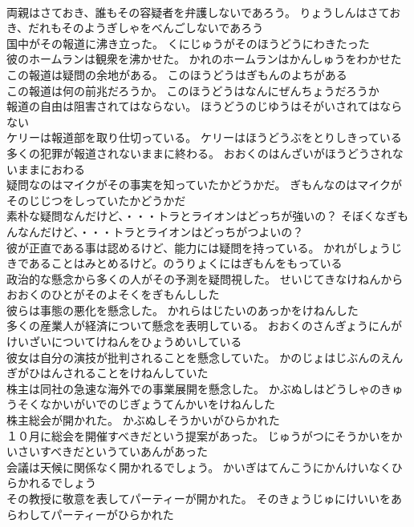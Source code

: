 \documentclass[8pt]{extreport}
\begin{document}
\begin{CJK}{UTF8}{min}
\\	両親はさておき、誰もその容疑者を弁護しないであろう。	りょうしんはさておき、だれもそのようぎしゃをべんごしないであろう 
\\	国中がその報道に沸き立った。	くにじゅうがそのほうどうにわきたった 
\\	彼のホームランは観衆を沸かせた。	かれのホームランはかんしゅうをわかせた 
\\	この報道は疑問の余地がある。	このほうどうはぎもんのよちがある 
\\	この報道は何の前兆だろうか。	このほうどうはなんにぜんちょうだろうか 
\\	報道の自由は阻害されてはならない。	ほうどうのじゆうはそがいされてはならない 
\\	ケリーは報道部を取り仕切っている。	ケリーはほうどうぶをとりしきっている 
\\	多くの犯罪が報道されないままに終わる。	おおくのはんざいがほうどうされないままにおわる 
\\	疑問なのはマイクがその事実を知っていたかどうかだ。	ぎもんなのはマイクがそのじじつをしっていたかどうかだ 
\\	素朴な疑問なんだけど、・・・トラとライオンはどっちが強いの？	そぼくなぎもんなんだけど、・・・トラとライオンはどっちがつよいの？ 
\\	彼が正直である事は認めるけど、能力には疑問を持っている。	かれがしょうじきであることはみとめるけど。のうりょくにはぎもんをもっている 
\\	政治的な懸念から多くの人がその予測を疑問視した。	せいじてきなけねんからおおくのひとがそのよそくをぎもんしした 
\\	彼らは事態の悪化を懸念した。	かれらはじたいのあっかをけねんした 
\\	多くの産業人が経済について懸念を表明している。	おおくのさんぎょうにんがけいざいについてけねんをひょうめいしている 
\\	彼女は自分の演技が批判されることを懸念していた。	かのじょはじぶんのえんぎがひはんされることをけねんしていた 
\\	株主は同社の急速な海外での事業展開を懸念した。	かぶぬしはどうしゃのきゅうそくなかいがいでのじぎょうてんかいをけねんした 
\\	株主総会が開かれた。	かぶぬしそうかいがひらかれた 
\\	１０月に総会を開催すべきだという提案があった。	じゅうがつにそうかいをかいさいすべきだというていあんがあった 
\\	会議は天候に関係なく開かれるでしょう。	かいぎはてんこうにかんけいなくひらかれるでしょう 
\\	その教授に敬意を表してパーティーが開かれた。	そのきょうじゅにけいいをあらわしてパーティーがひらかれた 

\end{CJK}
\end{document}
